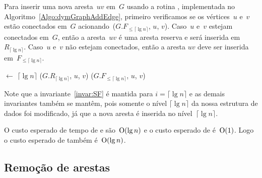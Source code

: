 Para inserir uma nova aresta~$uv$ em~$G$ usando a rotina \dymGraphAddEdge{}, implementada no Algoritmo~\ref{Algo:dymGraphAddEdge}, primeiro verificamos se os vértices~$u$ e~$v$ estão conectados em~$G$ acionando~\dymForestQuery($G.F_{\leqslant \lceil \lg n \rceil}$, $u$, $v$). Caso~$u$ e~$v$ estejam conectados em~$G$, então a aresta~$uv$ é uma aresta reserva e será inserida em~$R_{\lceil \lg n \rceil}$. Caso~$u$ e~$v$ não estejam conectados, então a aresta $uv$ deve ser inserida em~$F_{\leqslant \lceil \lg n \rceil}$.

\begin{algorithm}
\caption{\dymGraphAddEdge($G$, $u$, $v$)}
\label{Algo:dymGraphAddEdge}
\begin{algorithmic}[1]
\State \nivel[$u$,$v$] $\gets$ $\lceil \lg n \rceil$
\State \graphAdd($G$.$R_{\lceil \lg n \rceil}$, $u$, $v$)
\Else 
\State \dymForestAddEdge($G.F_{\leqslant\lceil \lg n \rceil}$, $u$, $v$)
\EndIf
\end{algorithmic}
\end{algorithm}

Note que a invariante~\ref{invar:SF} é mantida para $i = \lceil \lg n \rceil$ e as demais invariantes também se mantêm, pois somente o nível $\lceil \lg n \rceil$ da nossa estrutura de dados foi modificado, já que a nova aresta é inserida no nível~$\lceil \lg n \rceil$. 

O custo esperado de tempo de \dymForestQuery{} e \dymGraphAddEdge{} são~$\mathrm{O}(\lg n)$ e o custo esperado de \graphAdd{} é~$\mathrm{O}(1)$. Logo o custo esperado de \dymGraphAddEdge{} também é~$\mathrm{O}(\lg n)$.

\subsection{Remoção de arestas}

